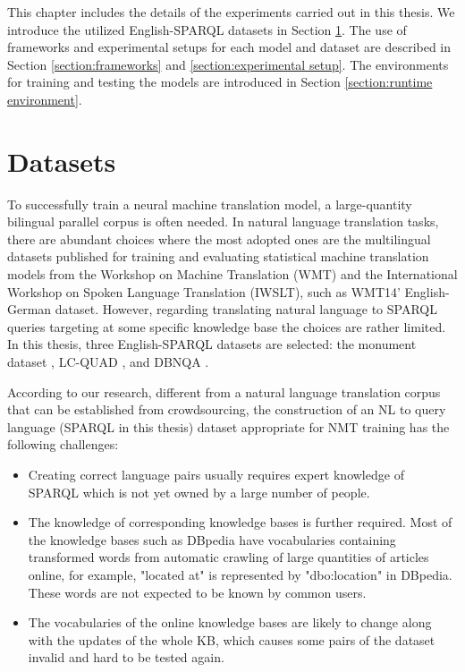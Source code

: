 
This chapter includes the details of the experiments carried out in this thesis. We introduce the utilized English-SPARQL datasets in Section \ref{section:datasets}. The use of frameworks and experimental setups for each model and dataset are described in Section \ref{section:frameworks} and \ref{section:experimental setup}. The environments for training and testing the models are introduced in Section \ref{section:runtime environment}.

\section{Datasets} \label{section:datasets}

To successfully train a neural machine translation model, a large-quantity bilingual parallel corpus is often needed. In natural language translation tasks, there are abundant choices where the most adopted ones are the multilingual datasets published for training and evaluating statistical machine translation models from the Workshop on Machine Translation (WMT) and the International Workshop on Spoken Language Translation (IWSLT), such as WMT14' English-German dataset. However, regarding translating natural language to SPARQL queries targeting at some specific knowledge base the choices are rather limited. In this thesis, three English-SPARQL datasets are selected: the monument dataset \cite{Soru2018a}, LC-QUAD \cite{trivedi2017lc}, and DBNQA \cite{Soru2018dbnqa}. 

According to our research, different from a natural language translation corpus that can be established from crowdsourcing, the construction of an NL to query language (SPARQL in this thesis) dataset appropriate for NMT training has the following challenges:
\begin{itemize}
\item Creating correct language pairs usually requires expert knowledge of SPARQL which is not yet owned by a large number of people. 
\item The knowledge of corresponding knowledge bases is further required. Most of the knowledge bases such as DBpedia have vocabularies containing transformed words from automatic crawling of large quantities of articles online, for example, "located at" is represented by "dbo:location" in DBpedia. These words are not expected to be known by common users.
\item The vocabularies of the online knowledge bases are likely to change along with the updates of the whole KB, which causes some pairs of the dataset invalid and hard to be tested again.
\end{itemize}

